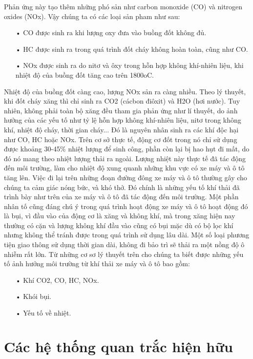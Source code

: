 Phản ứng này tạo thêm những phó sản như carbon monoxide (CO) và nitrogen oxides (NOx). Vậy chúng ta có các loại sản pham như sau:
\begin{itemize}
\item[•]CO được sinh ra khi lượng oxy đưa vào buồng đốt không đủ.
\item[•]HC được sinh ra trong quá trình đốt cháy không hoàn toàn, cũng như CO.
\item[•]NOx được sinh ra do nitơ và ôxy trong hỗn hợp không khí-nhiên liệu, khi nhiệt độ của buồng đốt tăng cao trên 1800oC.
\end{itemize}
 Nhiệt độ của buồng đốt càng cao, lượng NOx sản ra càng nhiều.
Theo lý thuyết, khi đốt cháy xăng thì chỉ sinh ra CO2 (cácbon điôxit) và H2O (hơi nước). Tuy nhiên, không phải toàn bộ xăng đều tham gia phản ứng như lí thuyết, do ảnh hưởng của các yếu tố như tỷ lệ hỗn hợp không khí-nhiên liệu, nitơ trong không khí, nhiệt độ cháy, thời gian cháy... Đó là nguyên nhân sinh ra các khí độc hại như CO, HC hoặc NOx.
Trên cơ sở thực tế, động cơ đốt trong nó chỉ sử dụng được khoảng 30-45\% nhiệt lượng để sinh công, phần còn lại bị hao hụt đi mất, do đó nó mang theo nhiệt lượng thải ra ngoài. Lượng nhiệt này thực tế đã tác động đến môi trường, làm cho nhiệt độ xung quanh những khu vực có xe máy và ô tô tăng lên. Việc đi lại trên những đoạn đường đông xe máy và ô tô thường gây cho chúng ta cảm giác nóng bức, và khó thở. Đó chính là những yếu tố khí thải đã trình bày như trên của xe máy và ô tô đã tác động đến môi trường.
Một phần nhân tố cũng đáng chú ý trong quá trình hoạt động xe máy và ô tô hoạt động đó là bụi, vì đầu vào của động cơ là xăng và không khí, mà trong xăng hiện nay thường có cặn và lượng không khí đầu vào cũng có bụi mặc dù có bộ lọc khí nhưng không thể tránh được trong quá trình sử dụng lâu dài. Một số loại phương tiện giao thông sử dụng thời gian dài, không đi bảo trì sẽ thải ra một nồng độ ô nhiễm rất lớn.
Từ những cơ sơ lý thuyết trên cho chúng ta biết được những yếu tố ảnh hưởng môi trường từ khí thải xe máy và ô tô bao gồm:
\begin{itemize}
\item[•]Khí CO2, CO, HC, NOx.
\item[•]Khói bụi.
\item[•]Yếu tố về nhiệt.
\end{itemize}








\section{Các hệ thống quan trắc hiện hữu}
